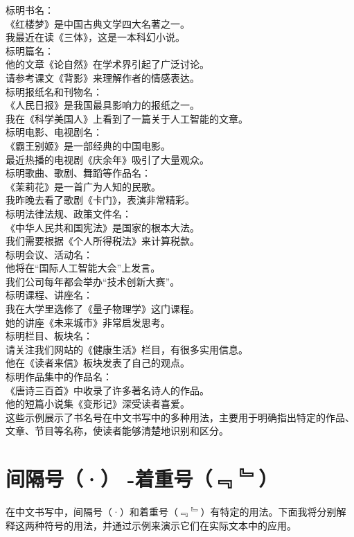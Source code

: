 \documentclass[12pt]{book}
\begin{document}
标明书名：\\
《红楼梦》是中国古典文学四大名著之一。\\
我最近在读《三体》，这是一本科幻小说。\\
标明篇名：\\
他的文章《论自然》在学术界引起了广泛讨论。\\
请参考课文《背影》来理解作者的情感表达。\\
标明报纸名和刊物名：\\
《人民日报》是我国最具影响力的报纸之一。\\
我在《科学美国人》上看到了一篇关于人工智能的文章。\\
标明电影、电视剧名：\\
《霸王别姬》是一部经典的中国电影。\\
最近热播的电视剧《庆余年》吸引了大量观众。\\
标明歌曲、歌剧、舞蹈等作品名：\\
《茉莉花》是一首广为人知的民歌。\\
我昨晚去看了歌剧《卡门》，表演非常精彩。\\
标明法律法规、政策文件名：\\
《中华人民共和国宪法》是国家的根本大法。\\
我们需要根据《个人所得税法》来计算税款。\\
标明会议、活动名：\\
他将在“国际人工智能大会”上发言。\\
我们公司每年都会举办“技术创新大赛”。\\
标明课程、讲座名：\\
我在大学里选修了《量子物理学》这门课程。\\
她的讲座《未来城市》非常启发思考。\\
标明栏目、板块名：\\
请关注我们网站的《健康生活》栏目，有很多实用信息。\\
他在《读者来信》板块发表了自己的观点。\\
标明作品集中的作品名：\\
《唐诗三百首》中收录了许多著名诗人的作品。\\
他的短篇小说集《变形记》深受读者喜爱。\\
这些示例展示了书名号在中文书写中的多种用法，主要用于明确指出特定的作品、文章、节目等名称，使读者能够清楚地识别和区分。\\

\section{间隔号（·） -着重号（﹃ ﹄）}
在中文书写中，间隔号（·）和着重号（﹃ ﹄）有特定的用法。下面我将分别解释这两种符号的用法，并通过示例来演示它们在实际文本中的应用。\\
\end{document}

